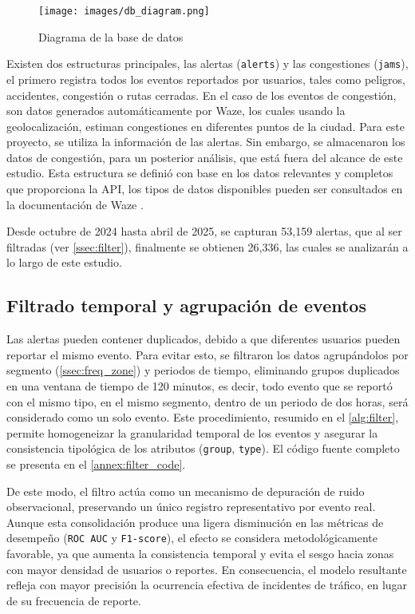 \documentclass[12pt]{article}
\begin{document}
\begin{figure}[H]
    \centering
    \texttt{[image: images/db\_diagram.png]}
    \caption{Diagrama de la base de datos}
    \label{fig:db_diagram}
\end{figure}

Existen dos estructuras principales, las alertas (\texttt{alerts}) y las congestiones (\texttt{jams}), el primero registra todos los eventos reportados por usuarios, tales como peligros, accidentes, congestión o rutas cerradas. En el caso de los eventos de congestión, son datos generados automáticamente por Waze, los cuales usando la geolocalización, estiman congestiones en diferentes puntos de la ciudad. Para este proyecto, se utiliza la información de las alertas. Sin embargo, se almacenaron los datos de congestión, para un posterior análisis, que está fuera del alcance de este estudio. Esta estructura se definió con base en los datos relevantes y completos que proporciona la API, los tipos de datos disponibles pueden ser consultados en la documentación de Waze \parencite{waze2024}.

Desde octubre de 2024 hasta abril de 2025, se capturan 53,159 alertas, que al ser filtradas (ver \autoref{ssec:filter}), finalmente se obtienen 26,336, las cuales se analizarán a lo largo de este estudio.


\subsection{Filtrado temporal y agrupación de eventos} \label{ssec:filter}

Las alertas pueden contener duplicados, debido a que diferentes usuarios pueden reportar el mismo evento. Para evitar esto, se filtraron los datos agrupándolos por segmento (\autoref{ssec:freq_zone}) y periodos de tiempo, eliminando grupos duplicados en una ventana de tiempo de 120 minutos, es decir, todo evento que se reportó con el mismo tipo, en el mismo segmento, dentro de un periodo de dos horas, será considerado como un solo evento. Este procedimiento, resumido en el \autoref{alg:filter}, permite homogeneizar la granularidad temporal de los eventos y asegurar la consistencia tipológica de los atributos (\texttt{group}, \texttt{type}). El código fuente completo se presenta en el \autoref{annex:filter_code}.

De este modo, el filtro actúa como un mecanismo de depuración de ruido observacional, preservando un único registro representativo por evento real. Aunque esta consolidación produce una ligera disminución en las métricas de desempeño (\texttt{ROC AUC} y \texttt{F1-score}), el efecto se considera metodológicamente favorable, ya que aumenta la consistencia temporal y evita el sesgo hacia zonas con mayor densidad de usuarios o reportes. En consecuencia, el modelo resultante refleja con mayor precisión la ocurrencia efectiva de incidentes de tráfico, en lugar de su frecuencia de reporte.
\end{document}
